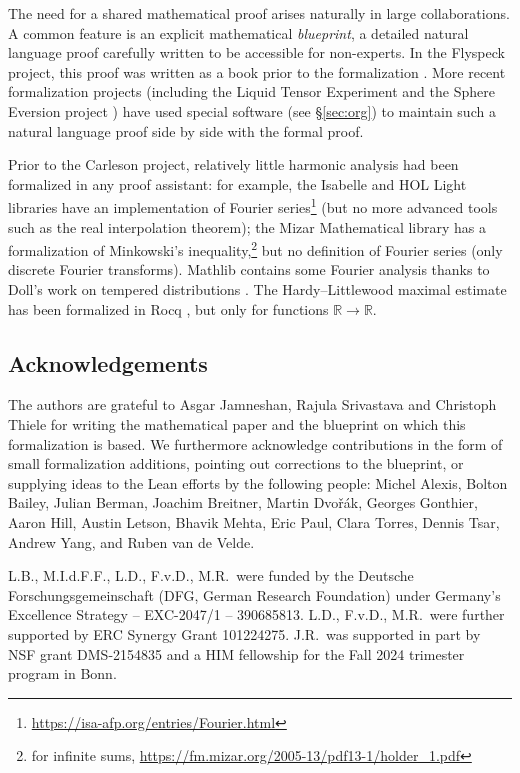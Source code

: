 \documentclass[12pt, reqno]{amsart}
\newcommand*{\real}{\mathbb{R}} %
\theoremstyle{definition}
\theoremstyle{plain}
\begin{document}
The need for a shared mathematical proof arises naturally in large collaborations.
A common feature is an explicit mathematical \emph{blueprint}, a detailed natural language proof carefully written to be accessible for non-experts. In the Flyspeck project, this proof was written as a book prior to the formalization \cite{HalesFlyspeckBook}. More recent formalization projects (including the Liquid Tensor Experiment and the Sphere Eversion project \cite{SphereEversionCPP}) have used special software (see \S\ref{sec:org}) to maintain such a natural language proof side by side with the formal proof.

Prior to the Carleson project, relatively little harmonic analysis had been formalized in any proof assistant: for example, the Isabelle and HOL Light libraries have an implementation of Fourier series\footnote{\url{https://isa-afp.org/entries/Fourier.html}} (but no more advanced tools such as the real interpolation theorem); the Mizar Mathematical library has a formalization of Minkowski's inequality,\footnote{for infinite sums, \url{https://fm.mizar.org/2005-13/pdf13-1/holder_1.pdf}} but no definition of Fourier series (only discrete Fourier transforms).
Mathlib contains some Fourier analysis thanks to Doll's work on tempered distributions \cite{DollSobolevFourier}.
The Hardy--Littlewood maximal estimate has been formalized in Rocq \cites{AffeldtFTCRocq,AffeldtLebesgueDiffRocq}, but only for functions $\real\to\real$.

\subsection*{Acknowledgements}
The authors are grateful to Asgar Jamneshan, Rajula Srivastava and Christoph Thiele for writing the mathematical paper \cite{ThieleCarlesonPreprint} and the blueprint \cite{CarlesonBlueprint} on which this formalization is based.
We furthermore acknowledge contributions in the form of small formalization additions,
pointing out corrections to the blueprint,
or supplying ideas to the Lean efforts by the following people:
Michel Alexis,
Bolton Bailey,
Julian Berman,
Joachim Breitner,
Martin Dvořák,
Georges Gonthier,
Aaron Hill,
Austin Letson,
Bhavik Mehta,
Eric Paul,
Clara Torres,
Dennis Tsar,
Andrew Yang, and
Ruben van de Velde.

L.B., M.I.d.F.F., L.D., F.v.D., M.R.\ were funded by the Deutsche For\-schungs\-gemein\-schaft (DFG, German Research Foundation) under Germany's Excellence Strategy -- EXC-2047/1 -- 390685813. L.D., F.v.D., M.R.\ were further supported by ERC Synergy Grant 101224275.
J.R.\ was supported in part by NSF grant DMS-2154835 and a HIM fellowship for the Fall 2024 trimester program in Bonn.
\end{document}
